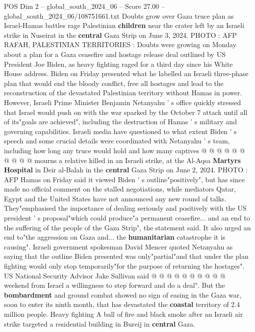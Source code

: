 \begin{textsample}{POS Dim 2 – global\_south\_2024\_06 – Score 27.00 – global\_south\_2024\_06/108751661.txt}  \label{ex:f2_pos_054}
Doubts grow over Gaza truce plan as Israel-Hamas battles rage Palestinian \textbf{children} near the crater left by an Israeli strike in Nuseirat in the \textbf{central} Gaza Strip on June 3, 2024.
PHOTO : AFP RAFAH, PALESTINIAN TERRITORIES : Doubts were growing on Monday about a plan for a Gaza ceasefire and hostage release deal outlined by US President Joe Biden, as heavy fighting raged for a third day since his White House address.
Biden on Friday presented what he labelled an Israeli three-phase plan that would end the bloody conflict, free all hostages and lead to the reconstruction of the devastated Palestinian territory without Hamas in power.
However, Israeli Prime Minister Benjamin Netanyahu ' s office quickly stressed that Israel would push on with the war sparked by the October 7 attack until all of its"goals are achieved", including the destruction of Hamas ' s military and governing capabilities.
Israeli media have questioned to what extent Biden ' s speech and some crucial details were coordinated with Netanyahu ' s team, including how long any truce would hold and how many captives @ @ @ @ @ @ @ @ @ @ mourns a relative killed in an Israeli strike, at the Al-Aqsa \textbf{Martyrs} \textbf{Hospital} in Deir al-Balah in the \textbf{central} Gaza Strip on June 2, 2024.
PHOTO : AFP Hamas on Friday said it viewed Biden ' s outline"positively", but has since made no official comment on the stalled negotiations, while mediators Qatar, Egypt and the United States have not announced any new round of talks.
They"emphasised the importance of dealing seriously and positively with the US president ' s proposal"which could produce"a permanent ceasefire... and an end to the suffering of the people of the Gaza Strip", the statement said.
It also urged an end to"the aggression on Gaza and... the \textbf{humanitarian} catastrophe it is causing".
Israeli government spokesman David Mencer quoted Netanyahu as saying that the outline Biden presented was only"partial"and that under the plan fighting would only stop temporarily"for the purpose of returning the hostages".
US National Security Advisor Jake Sullivan said @ @ @ @ @ @ @ @ @ @ weekend from Israel a willingness to step forward and do a deal".
But the \textbf{bombardment} and ground combat showed no sign of easing in the Gaza war, soon to enter its ninth month, that has devastated the \textbf{coastal} territory of 2.4 million people.
Heavy fighting A ball of fire and black smoke after an Israeli air strike targeted a residential building in Bureij in \textbf{central} Gaza.

\end{textsample}
